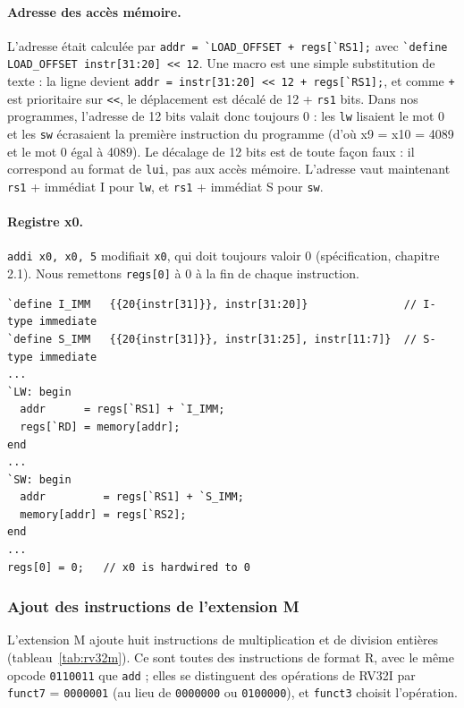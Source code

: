 \paragraph{Adresse des accès mémoire.}
L'adresse était calculée par \lstinline[style=vlinline]|addr = `LOAD_OFFSET + regs[`RS1];| avec
\lstinline[style=vlinline]|`define LOAD_OFFSET instr[31:20] << 12|. Une macro est une simple
substitution de texte : la ligne devient
\lstinline[style=vlinline]|addr = instr[31:20] << 12 + regs[`RS1];|, et comme \texttt{+} est
prioritaire sur \lstinline[style=vlinline]|<<|, le déplacement est décalé de 12 + \texttt{rs1} bits. Dans nos
programmes, l'adresse de 12 bits valait donc toujours 0 : les \texttt{lw} lisaient le mot 0 et
les \texttt{sw} écrasaient la première instruction du programme (d'où x9 = x10 = 4089 et le
mot 0 égal à 4089). Le décalage de 12 bits est de toute façon faux : il correspond au format de
\texttt{lui}, pas aux accès mémoire. L'adresse vaut maintenant \texttt{rs1} + immédiat I pour
\texttt{lw}, et \texttt{rs1} + immédiat S pour \texttt{sw}.

\paragraph{Registre x0.}
\texttt{addi x0, x0, 5} modifiait \texttt{x0}, qui doit toujours valoir 0 (spécification,
chapitre 2.1). Nous remettons \texttt{regs[0]} à 0 à la fin de chaque instruction.

\noindent\begin{minipage}{\linewidth}
\begin{lstlisting}[style=verilog, caption={Corrections du modèle (immédiats, adresses, x0)}, label={lst:corrections}]
`define I_IMM   {{20{instr[31]}}, instr[31:20]}               // I-type immediate
`define S_IMM   {{20{instr[31]}}, instr[31:25], instr[11:7]}  // S-type immediate
...
`LW: begin
  addr      = regs[`RS1] + `I_IMM;
  regs[`RD] = memory[addr];
end
...
`SW: begin
  addr         = regs[`RS1] + `S_IMM;
  memory[addr] = regs[`RS2];
end
...
regs[0] = 0;   // x0 is hardwired to 0
\end{lstlisting}
\end{minipage}\par

\subsubsection{Ajout des instructions de l'extension M}
\label{sec:rv32im}

L'extension M ajoute huit instructions de multiplication et de division entières
(tableau~\ref{tab:rv32m}). Ce sont toutes des instructions de format R, avec le même opcode
\texttt{0110011} que \texttt{add} ; elles se distinguent des opérations de RV32I par
\texttt{funct7} = \texttt{0000001} (au lieu de \texttt{0000000} ou \texttt{0100000}), et
\texttt{funct3} choisit l'opération.

